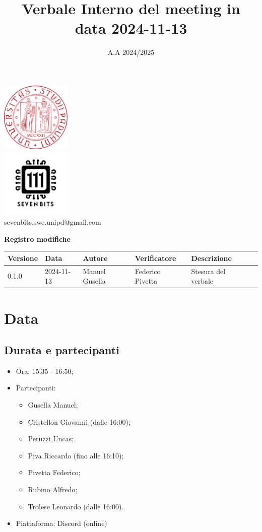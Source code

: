 \documentclass[10pt]{article}
\title{Verbale Interno del meeting in data 2024-11-13}
\date{A.A 2024/2025}
\begin{document}
\maketitle
\begin{center}
\includegraphics[width=0.25\textwidth]{LogoUnipd}\\
\includegraphics[width=0.25\textwidth]{Sevenbitslogo}\\
sevenbits.swe.unipd@gmail.com\\
\vspace{2mm}

\textbf{Registro modifiche}\\
\vspace{2mm}
\begin{tabular}{|l|l|l|l|l|l|}
\hline
\textbf{Versione} & \textbf{Data} & \textbf{Autore} & \textbf{Verificatore} & \textbf{Descrizione} \\
\hline
0.1.0 & 2024-11-13 & Manuel Gusella & Federico Pivetta & Stesura del verbale\\
\hline
\end{tabular}
\end{center}

\newpage
\tableofcontents
\newpage
\section{Data}
\subsection{Durata e partecipanti}
\begin{itemize}
\item Ora: 15:35 - 16:50;
\item Partecipanti: 	
	\begin{itemize}
	\item Gusella Manuel;
	\item Cristellon Giovanni (dalle 16:00);
	\item Peruzzi Uncas;
	\item Piva Riccardo (fino alle 16:10);
	\item Pivetta Federico;
	\item Rubino Alfredo;
	\item Trolese Leonardo (dalle 16:00).
	\end{itemize}
\item Piattaforma: Discord (online)
\end{itemize}
\end{document}

